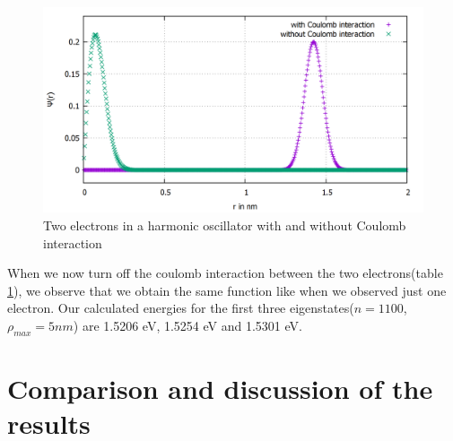 \documentclass[10pt,a4paper]{article}
\begin{document}
\begin{figure}[h]
	\includegraphics[scale = 0.25]{k1_comparison_2El_n500.png}
	\centering
	\caption{Two electrons in a harmonic oscillator with and without Coulomb interaction}
	\label{plot2elrcoulomb}
\end{figure}

When we now turn off the coulomb interaction between the two electrons(table \ref{plot2elrcoulomb}), we observe that we obtain the same function like when we observed just one electron. Our calculated energies for the first three eigenstates($n = 1100$, $\rho_{max} = 5 nm$) are 1.5206 eV, 1.5254 eV and 1.5301 eV.









\section{Comparison and discussion of the results}
\end{document}

